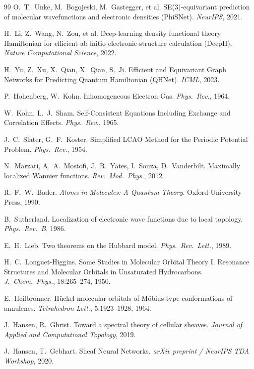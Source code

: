 \documentclass[pdflatex,sn-mathphys-num]{sn-jnl}%
\theoremstyle{thmstyleone}
\theoremstyle{thmstyletwo}
\theoremstyle{thmstylethree}
\begin{document}
\begin{thebibliography}{99}
 O.~T.~Unke, M.~Bogojeski, M.~Gastegger, et al. SE(3)-equivariant prediction of molecular wavefunctions and electronic densities (PhiSNet). \emph{NeurIPS}, 2021.

 H.~Li, Z.~Wang, N.~Zou, et al. Deep-learning density functional theory Hamiltonian for efficient ab initio electronic-structure calculation (DeepH). \emph{Nature Computational Science}, 2022.

 H.~Yu, Z.~Xu, X.~Qian, X.~Qian, S.~Ji. Efficient and Equivariant Graph Networks for Predicting Quantum Hamiltonian (QHNet). \emph{ICML}, 2023.

 P.~Hohenberg, W.~Kohn. Inhomogeneous Electron Gas. \emph{Phys.\ Rev.}, 1964.

 W.~Kohn, L.~J.~Sham. Self-Consistent Equations Including Exchange and Correlation Effects. \emph{Phys.\ Rev.}, 1965.

 J.~C.~Slater, G.~F.~Koster. Simplified LCAO Method for the Periodic Potential Problem. \emph{Phys.\ Rev.}, 1954.

 N.~Marzari, A.~A.~Mostofi, J.~R.~Yates, I.~Souza, D.~Vanderbilt. Maximally localized Wannier functions. \emph{Rev.\ Mod.\ Phys.}, 2012.

 R.~F.~W.~Bader. \emph{Atoms in Molecules: A Quantum Theory}. Oxford University Press, 1990.

 B.~Sutherland. Localization of electronic wave functions due to local topology. \emph{Phys.\ Rev.\ B}, 1986.

 E.~H.~Lieb. Two theorems on the Hubbard model. \emph{Phys.\ Rev.\ Lett.}, 1989.

 H.~C.~Longuet-Higgins. Some Studies in Molecular Orbital Theory I. Resonance Structures and Molecular Orbitals in Unsaturated Hydrocarbons. \emph{J.\ Chem.\ Phys.}, 18:265--274, 1950.

 E.~Heilbronner. H\"uckel molecular orbitals of M\"obius-type conformations of annulenes. \emph{Tetrahedron Lett.}, 5:1923--1928, 1964.

 J.~Hansen, R.~Ghrist. Toward a spectral theory of cellular sheaves. \emph{Journal of Applied and Computational Topology}, 2019.

 J.~Hansen, T.~Gebhart. Sheaf Neural Networks. \emph{arXiv preprint / NeurIPS TDA Workshop}, 2020.


\end{thebibliography}
\end{document}
